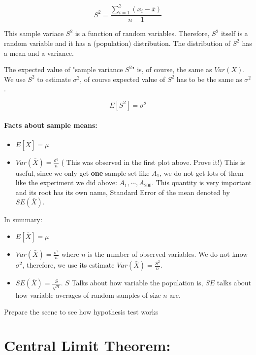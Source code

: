\documentclass[11pt]{article}
\providecommand{\tightlist}{%
      \setlength{\itemsep}{0pt}\setlength{\parskip}{0pt}}
\begin{document}
\[ S^2 = \frac{\sum_{i=1}^2(x_i - \bar{x})}{n-1} \tag{4} \]

This sample variace $S^2$ is a function of random variables.
Therefore, $S^2$ itself is a random variable and it has a (population)
distribution. The distribution of $S^2$ has a mean and a variance.

The expected value of "sample variance $S^2$" is, of course, the same
as $Var(X)$. We use $S^2$ to estimate $\sigma^2$, of course
expected value of $S^2$ has to be the same as $\sigma^2$.

\[E[S^2] = \sigma^2 \tag{5}\]

    \paragraph{Facts about sample means:}\label{facts-about-sample-means}

\begin{itemize}
\tightlist
\item
  $E[\bar{X}] = \mu$
\item
  $Var(\bar{X}) = \frac{\sigma^2}{n}$ ( This was observed in the first
  plot above. Prove it!) This is useful, since we only get \textbf{one}
  sample set like $A_1$, we do not get lots of them like the
  experiment we did above: $A_1, \cdots, A_{200}$. This quantity is
  very important and its root has its own name, Standard Error of the
  mean denoted by $SE(\bar{X})$.
\end{itemize}

In summary:

\begin{itemize}
\item
  $E[\bar{X}] = \mu$
\item
  $Var(\bar{X}) = \frac{\sigma^2}{n}$ where $n$ is the number of
  observed variables. We do not know $\sigma^2$, therefore, we use its
  estimate $Var(\bar{X}) = \frac{S^2}{n}$.
\item
  $SE(\bar{X}) = \frac{S}{\sqrt{n}}$. $S$ Talks about how variable
  the population is, $SE$ talks about how variable averages of random
  samples of size $n$ are.
\end{itemize}

    Prepare the scene to see how hypothesis test works

    \section{Central Limit Theorem:}\label{central-limit-theorem}
\end{document}
